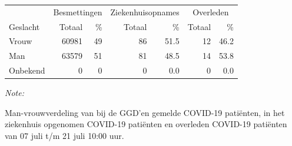 \documentclass[
  english,
  man,floatsintext]{apa6}
\begin{document}
\begin{table}
\centering\begingroup\fontsize{11}{13}\selectfont

\begin{threeparttable}
\begin{tabular}{lrrrrrr}
\toprule
\multicolumn{1}{c}{ } & \multicolumn{2}{c}{Besmettingen} & \multicolumn{2}{c}{Ziekenhuisopnames} & \multicolumn{2}{c}{Overleden} \\
\cmidrule(l{3pt}r{3pt}){2-3} \cmidrule(l{3pt}r{3pt}){4-5} \cmidrule(l{3pt}r{3pt}){6-7}
Geslacht & Totaal & \% & Totaal & \% & Totaal & \%\\
\midrule
Vrouw & 60981 & 49 & 86 & 51.5 & 12 & 46.2\\
Man & 63579 & 51 & 81 & 48.5 & 14 & 53.8\\
Onbekend & 0 & 0 & 0 & 0.0 & 0 & 0.0\\
\bottomrule
\end{tabular}
\begin{tablenotes}
\item \textit{Note: } 
\item Man-vrouwverdeling van bij de GGD’en gemelde COVID-19 patiënten, in het ziekenhuis opgenomen COVID-19 patiënten en overleden COVID-19 patiënten van 07 juli t/m 21 juli 10:00 uur.
\end{tablenotes}
\end{threeparttable}
\endgroup{}
\end{table}
\newpage
\end{document}
